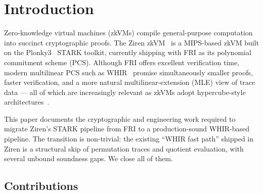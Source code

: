 \section{Introduction}
\label{sec:introduction}

Zero-knowledge virtual machines (zkVMs) compile general-purpose
computation into succinct cryptographic proofs.  The Ziren
zkVM~\cite{ziren} is a MIPS-based zkVM built on the
Plonky3~\cite{plonky3} STARK toolkit, currently shipping with FRI as
its polynomial commitment scheme (PCS).  Although FRI offers
excellent verification time, modern multilinear PCS such as
WHIR~\cite{whir2024} promise simultaneously smaller proofs,
faster verification, and a more natural multilinear-extension (MLE)
view of trace data --- all of which are increasingly relevant as
zkVMs adopt hypercube-style architectures~\cite{sp1-hypercube}.

This paper documents the cryptographic and engineering work required
to migrate Ziren's STARK pipeline from FRI to a production-sound
WHIR-based pipeline.  The transition is non-trivial: the existing
``WHIR fast path'' shipped in Ziren is a structural skip of
permutation traces and quotient evaluation, with several unbound
soundness gaps.  We close all of them.

\subsection{Contributions}

